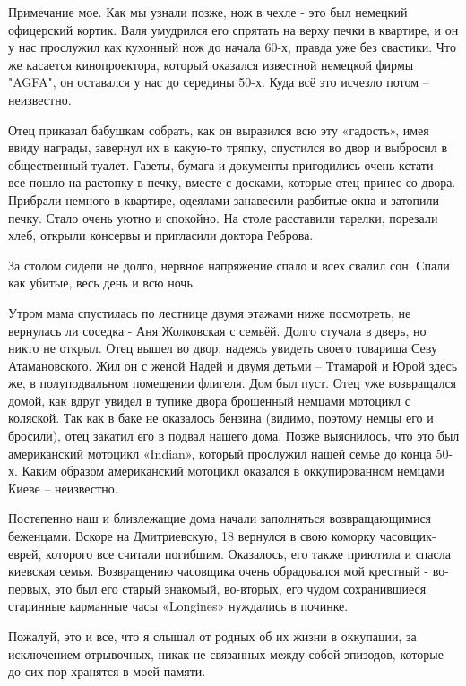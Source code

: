 Примечание мое. Как мы узнали позже, нож в чехле - это был немецкий офицерский
кортик. Валя умудрился его спрятать на верху печки в квартире, и он у нас
прослужил как кухонный нож до начала 60-х, правда уже без свастики. Что же
касается кинопроектора, который оказался известной немецкой фирмы "AGFA", он
оставался у нас до середины 50-х. Куда всё это исчезло потом – неизвестно. 

Отец приказал бабушкам собрать, как он выразился всю эту «гадость», имея ввиду
награды, завернул их в какую-то тряпку, спустился во двор и выбросил в
общественный туалет. Газеты, бумага и документы пригодились очень кстати - все
пошло на растопку в печку, вместе с досками, которые отец принес со двора.
Прибрали немного в квартире, одеялами занавесили разбитые окна и затопили
печку. Стало очень уютно и спокойно. На столе расставили тарелки, порезали
хлеб, открыли консервы и пригласили доктора Реброва.

За столом сидели не долго, нервное напряжение спало и всех свалил сон. Спали
как убитые, весь день и всю ночь. 

Утром мама спустилась по лестнице двумя этажами ниже посмотреть, не вернулась
ли соседка - Аня Жолковская с семьёй. Долго стучала в дверь, но никто не
открыл. Отец вышел во двор, надеясь увидеть своего товарища Севу Атамановского.
Жил он с женой Надей и двумя детьми – Ттамарой и Юрой здесь же, в
полуподвальном помещении флигеля. Дом был пуст. Отец уже возвращался домой, как
вдруг увидел в тупике двора брошенный немцами мотоцикл с коляской. Так как в
баке не оказалось бензина (видимо, поэтому немцы его и бросили), отец закатил
его в подвал нашего дома. Позже выяснилось, что это был американский мотоцикл
«Indian», который прослужил нашей семье до конца 50-х. Каким образом
американский мотоцикл оказался в оккупированном немцами Киеве – неизвестно. 

Постепенно наш и близлежащие дома начали заполняться возвращающимися беженцами.
Вскоре на Дмитриевскую, 18 вернулся в свою коморку часовщик-еврей, которого все
считали погибшим. Оказалось, его также приютила и спасла киевская семья.
Возвращению часовщика очень обрадовался мой крестный - во-первых, это был его
старый знакомый, во-вторых, его чудом сохранившиеся старинные карманные часы
«Longines» нуждались в починке.

Пожалуй, это и все, что я слышал от родных об их жизни в оккупации, за
исключением отрывочных, никак не связанных между собой эпизодов, которые до сих
пор хранятся в моей памяти.

